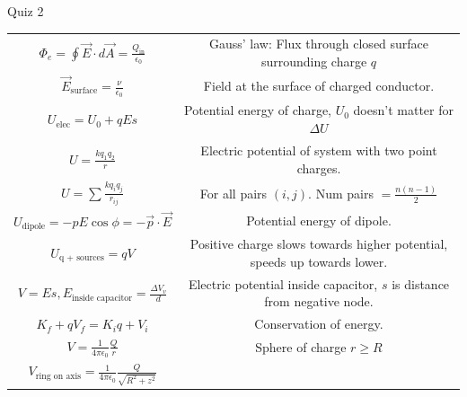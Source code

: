 \documentclass{article}
\newcommand{\eps}{\epsilon_0}
\newcommand{\K}{\frac{1}{4 \pi \epsilon_0}}
\begin{document}
\begin{center}
\begin{section}{Quiz 2}
\begin{tabular}{|c|c|}
		 $\Phi_e = \oint \vec E \cdot d \vec A = \frac{Q_\text{in}}{\epsilon_0}$                      & Gauss' law: Flux through closed surface surrounding charge $q$             \\

		 $\vec E_\text{surface} = \frac{\nu}{\eps}$                                                   & Field at the surface of charged conductor.                                 \\

		 $U_\text{elec} = U_0 + qEs$                                                                  & Potential energy of charge, $U_0$ doesn't matter for $\Delta U$            \\

		 $U = \frac{k q_1 q_2}{r}$                                                                    & Electric potential of system with two point charges.                       \\

		 $U = \sum \frac{k q_i q_j}{r_{ij}}$                                                          & For all pairs $(i,j)$. Num pairs $= \frac{n(n-1)}{2}$                      \\

		 $U_\text{dipole} = - p E \cos \phi = - \vec p \cdot \vec E$                                  & Potential energy of dipole.                                                \\

		 $U_\text{q + sources} = qV$                                                                  & Positive charge slows towards higher potential, speeds up towards lower.   \\

		 $V = Es, E_\text{inside capacitor} = \frac{\Delta V_v}{d}$                                   & Electric potential inside capacitor, $s$ is distance from negative node.   \\

		 $K_f + q V_f = K_i q + V_i$                                                                  & Conservation of energy.                                                    \\

		 $V = \K \frac{Q}{r}$                                                                         & Sphere of charge $r \ge R$                                                 \\

		 $V_\text{ring on axis} = \K \frac{Q}{\sqrt{R^2 + z^2}}$                                      &                                                                            \\


\end{tabular}
\end{section}
\end{center}
\end{document}
